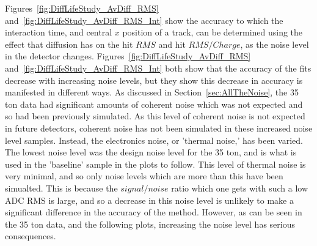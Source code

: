 Figures~\ref{fig:DiffLifeStudy_AvDiff_RMS} and~\ref{fig:DiffLifeStudy_AvDiff_RMS_Int} show the accuracy to which the interaction time, and central $x$ position of a track, can be determined using the effect that diffusion has on the hit $RMS$ and hit $RMS/Charge$, as the noise level in the detector changes. Figures~\ref{fig:DiffLifeStudy_AvDiff_RMS} and~\ref{fig:DiffLifeStudy_AvDiff_RMS_Int} both show that the accuracy of the fits decrease with increasing noise levels, but they show this decrease in accuracy is manifested in different ways. As discussed in Section~\ref{sec:AllTheNoise}, the 35 ton data had significant amounts of coherent noise which was not expected and so had been previously simulated. As this level of coherent noise is not expected in future detectors, coherent noise has not been simulated in these increased noise level samples. Instead, the electronics noise, or 'thermal noise,' has been varied. The lowest noise level was the design noise level for the 35 ton, and is what is used in the 'baseline' sample in the plots to follow. This level of thermal noise is very minimal, and so only noise levels which are more than this have been simualted. This is because the $signal/noise$ ratio which one gets with such a low ADC RMS is large, and so a decrease in this noise level is unlikely to make a significant difference in the accuracy of the method. However, as can be seen in the 35 ton data, and the following plots, increasing the noise level has serious consequences. \\

